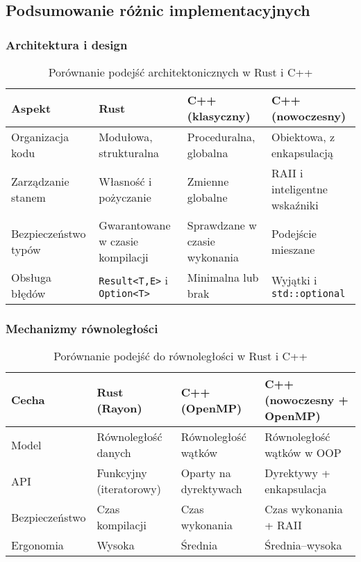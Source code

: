 \subsection{Podsumowanie różnic implementacyjnych}
\subsubsection{Architektura i design}

\begin{table}[H]
    \centering
    \caption{Porównanie podejść architektonicznych w Rust i C++}
    \begin{tabular}{|>{\centering}m{3.2cm}|>{\centering}m{3cm}|>{\centering}m{3.3cm}|>{\centering\arraybackslash}m{3.3cm}|}
    \hline
    \textbf{Aspekt} & \textbf{Rust} & \textbf{C++ (klasyczny)} & \textbf{C++ (nowoczesny)} \\
    \hline
    Organizacja kodu & Modułowa, strukturalna & Proceduralna, globalna & Obiektowa, z enkapsulacją \\ \hline
    Zarządzanie stanem & Własność i pożyczanie & Zmienne globalne & RAII i inteligentne wskaźniki \\ \hline
    Bezpieczeństwo typów & Gwarantowane w czasie kompilacji & Sprawdzane w czasie wykonania & Podejście mieszane \\ \hline
    Obsługa błędów & \texttt{Result<T,E>} i \texttt{Option<T>} & Minimalna lub brak & Wyjątki i \texttt{std::optional} \\
    \hline
    \end{tabular}
\end{table}

\subsubsection{Mechanizmy równoległości}
\begin{table}[H]
    \centering
    \caption{Porównanie podejść do równoległości w Rust i C++}
    \begin{tabular}{|>{\centering}m{3cm}|>{\centering}m{3cm}|>{\centering}m{3.3cm}|>{\centering\arraybackslash}m{3.3cm}|}
    \hline
    \textbf{Cecha} & \textbf{Rust (Rayon)} & \textbf{C++ (OpenMP)} & \textbf{C++ (nowoczesny + OpenMP)} \\
    \hline
    Model & Równoległość danych & Równoległość wątków & Równoległość wątków w OOP \\ \hline
    API & Funkcyjny (iteratorowy) & Oparty na dyrektywach & Dyrektywy + enkapsulacja \\ \hline
    Bezpieczeństwo & Czas kompilacji & Czas wykonania & Czas wykonania + RAII \\ \hline
    Ergonomia & Wysoka & Średnia & Średnia–wysoka \\ \hline
    \end{tabular}
\end{table}
